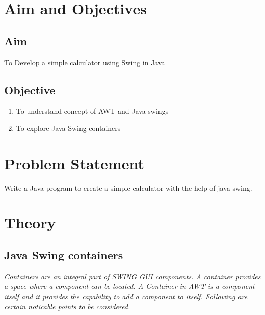 \documentclass[11pt]{article}
\begin{document}
\tableofcontents
\thispagestyle{empty}
\clearpage


\setcounter{page}{1}

\section{Aim and Objectives}
\subsection*{Aim}
To Develop a simple calculator using Swing in Java
\subsection*{Objective}
\begin{enumerate}
	\item To understand concept of AWT and Java swings
	\item To explore Java Swing containers
\end{enumerate}
\section{Problem Statement}
Write a Java program to create a simple calculator with the help of java swing.

\section{Theory}
\subsection{Java Swing containers}
\textit{Containers are an integral part of SWING GUI components. A container provides a space where a component can be located. A Container in AWT is a component itself and it provides the capability to add a component to itself. Following are certain noticable points to be considered.}
\end{document}
